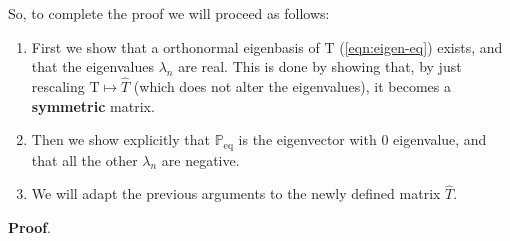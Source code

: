 \documentclass[../../main.tex]{subfiles}
\begin{document}
\medskip

So, to complete the proof we will proceed as follows:
\begin{enumerate}
    \item First we show that a orthonormal eigenbasis of $\mathrm{T}$ (\ref{eqn:eigen-eq}) exists, and that the eigenvalues $\lambda_n$ are real. This is done by showing that, by just rescaling $\mathrm{T} \mapsto \hat{T}$ (which does not alter the eigenvalues), it becomes a \textbf{symmetric} matrix.
    \item Then we show explicitly that $\mathbb{P}_{\mathrm{eq}}$ is the eigenvector with $0$ eigenvalue, and that all the other $\lambda_n$ are negative. 
    \item We will adapt the previous arguments to the newly defined matrix $\hat{T}$.
\end{enumerate}

\textbf{Proof}.
\end{document}
